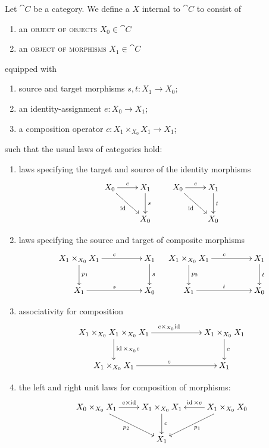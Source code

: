 
\begin{node}\label{internal-0004}%
\begin{definition}\label{internal-0000}%
Let $\cat{C}$ be a category. We define a 
$X$ internal to $\cat{C}$ to consist of
\begin{enumerate}
\item an \textsc{object of objects} $X_{0}\in\cat{C}$
\item an \textsc{object of morphisms} $X_{1}\in\cat{C}$
\end{enumerate}
equipped with
\begin{enumerate}
\item source and target morphisms $s,t\colon X_{1}\to X_{0}$;
\item an identity-assignment $e\colon X_{0}\to X_{1}$;
\item a composition operator $c\colon X_{1}\times_{X_{0}}X_{1}\to X_{1}$;
\end{enumerate}
such that the usual laws of categories hold:
\begin{enumerate}
\item laws specifying the target and source of the identity morphisms
\[ \xymatrix{X_{0} \ar[dr]_{\id} \ar[r]^{e} & X_{1} \ar[d]^{s}\\
& X_{0}}\qquad\xymatrix{X_{0} \ar[dr]_{\id} \ar[r]^{e} & X_{1} \ar[d]^{t}\\
& X_{0}}\]
\item laws specifying the source and target of composite morphisms
  \[\xymatrixcolsep{4pc} \xymatrix{X_{1}\times_{X_{0}}X_{1}\ar[d]^{p_{1}} \ar[r]^{c} & X_{1}\ar[d]^{s}\\
    X_{1} \ar[r]^{s}& X_{0}}\quad
  \xymatrix{X_{1}\times_{X_{0}}X_{1}\ar[d]^{p_{2}} \ar[r]^{c} & X_{1}\ar[d]^{t}\\
    X_{1} \ar[r]^{t}& X_{0}}\]
\item associativity for composition
\[\xymatrixcolsep{5pc} \xymatrix{X_{1}\times_{X_{0}}X_{1}\times_{X_{0}}X_{1}\ar[r]^{c\times_{X_{0}}\id}\ar[d]^{\id\times_{X_{0}}c}&X_{1}\times_{X_{0}}X_{1}\ar[d]^{c}\\
  X_{1}\times_{X_{0}}X_{1}\ar[r]^{c} & X_{1}}\]
\item the left and right unit laws for composition of morphisms:
\[\xymatrix{ X_{0}\times_{X_{0}} X_{1}\ar[r]^{e\times\id}\ar[dr]_{p_{2}} & X_{1}\times_{X_{0}} X_{1}\ar[d]^{c} & \ar[l]_{\id\times e} X_{1}\times_{X_{0}}X_{0}\ar[dl]^{p_{1}}\\
& X_{1} & }\]
\end{enumerate}


\end{definition}
\end{node}

